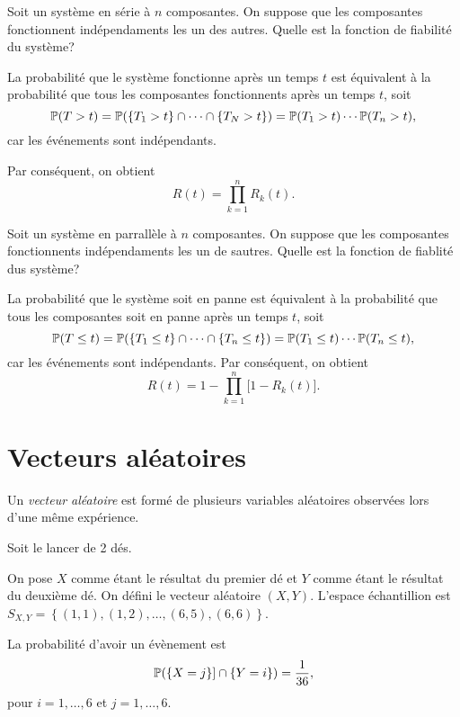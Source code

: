 \documentclass[11pt]{article}
\renewcommand\P{%
	\ensuremath{%
		\mathbb{P}%
	}%
}%
\begin{document}
\begin{exemple}
	Soit un système en série à $n$ composantes. On suppose que les composantes
	fonctionnent indépendaments les un des autres. Quelle est la fonction de
	fiabilité du système?

	La probabilité que le système fonctionne après un temps $t$ est équivalent
	à la probabilité que tous les composantes fonctionnents après un temps $t$,
	soit
	\begin{equation*}
		\P(T>t)
		=\P(\left\{T_1>t\right\}\cap\cdots\cap\left\{T_N>t\right\})
		=\P(T_1>t)\cdots\P(T_n>t),
	\end{equation*}
	car les événements sont indépendants. 
\end{exemple}
\addtocounter{exemple}{-1}
\begin{exemple}[suite]
	Par conséquent, on obtient
	\begin{equation*}
		R(t)=\prod_{k=1}^n R_k(t).
	\end{equation*}
\end{exemple}

\begin{exemple}
	Soit un système en parrallèle à $n$ composantes. On suppose que les
	composantes fonctionnents indépendaments les un de sautres. Quelle est la
	fonction de fiablité dus système?

	La probabilité que le système soit en panne est équivalent à la probabilité
	que tous les composantes soit en panne après un temps $t$, soit
	\begin{equation*}
		\P(T\leq t)
		=\P(\left\{T_1\leq t\right\}\cap\cdots\cap\left\{T_n\leq t\right\})
		=\P(T_1\leq t)\cdots\P(T_n\leq t),
	\end{equation*}
	car les événements sont indépendants. Par conséquent, on obtient
	\begin{equation*}
		R(t)=1-\prod_{k=1}^n\bigg[1-R_k(t)\bigg].
	\end{equation*}
\end{exemple}

\section{Vecteurs aléatoires}
\begin{definition}
	Un \textit{vecteur aléatoire} est formé de plusieurs variables aléatoires
	observées lors d'une même expérience.
\end{definition}

\begin{exemple}
	Soit le lancer de 2 dés.

	On pose $X$ comme étant le résultat du premier dé et $Y$ comme étant le 
	résultat du deuxième dé. On défini le vecteur aléatoire $(X,Y)$. L'espace
	échantillion est $S_{X,Y}=\left\{(1,1),(1,2),\dots,(6,5),(6,6)\right\}$.

	La probabilité d'avoir un évènement est
	\begin{equation*}
		\P(\left\{X=j\right\}]\cap\left\{Y=i\right\})=\frac{1}{36},
	\end{equation*}
	pour $i=1,\dots,6$ et $j=1,\dots,6$.
\end{exemple}
\end{document}
